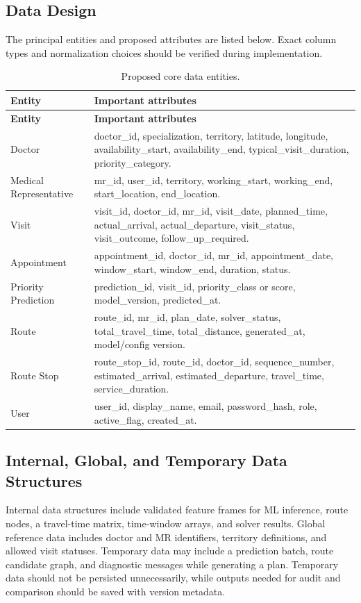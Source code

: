 \documentclass[12pt,a4paper,oneside]{report}
\begin{document}
\subsection{Data Design}
The principal entities and proposed attributes are listed below. Exact column types and normalization choices should be verified during implementation.
\begin{longtable}{p{32mm}p{91mm}}
\caption{Proposed core data entities.}\label{tab:data-entities}\\
\toprule
\textbf{Entity} & \textbf{Important attributes}\\
\midrule
\endfirsthead
\toprule
\textbf{Entity} & \textbf{Important attributes}\\
\midrule
\endhead
Doctor & doctor\_id, specialization, territory, latitude, longitude, availability\_start, availability\_end, typical\_visit\_duration, priority\_category.\\
Medical Representative & mr\_id, user\_id, territory, working\_start, working\_end, start\_location, end\_location.\\
Visit & visit\_id, doctor\_id, mr\_id, visit\_date, planned\_time, actual\_arrival, actual\_departure, visit\_status, visit\_outcome, follow\_up\_required.\\
Appointment & appointment\_id, doctor\_id, mr\_id, appointment\_date, window\_start, window\_end, duration, status.\\
Priority Prediction & prediction\_id, visit\_id, priority\_class or score, model\_version, predicted\_at.\\
Route & route\_id, mr\_id, plan\_date, solver\_status, total\_travel\_time, total\_distance, generated\_at, model/config version.\\
Route Stop & route\_stop\_id, route\_id, doctor\_id, sequence\_number, estimated\_arrival, estimated\_departure, travel\_time, service\_duration.\\
User & user\_id, display\_name, email, password\_hash, role, active\_flag, created\_at.\\
\bottomrule
\end{longtable}

\subsection{Internal, Global, and Temporary Data Structures}
Internal data structures include validated feature frames for ML inference, route nodes, a travel-time matrix, time-window arrays, and solver results. Global reference data includes doctor and MR identifiers, territory definitions, and allowed visit statuses. Temporary data may include a prediction batch, route candidate graph, and diagnostic messages while generating a plan. Temporary data should not be persisted unnecessarily, while outputs needed for audit and comparison should be saved with version metadata.
\end{document}

